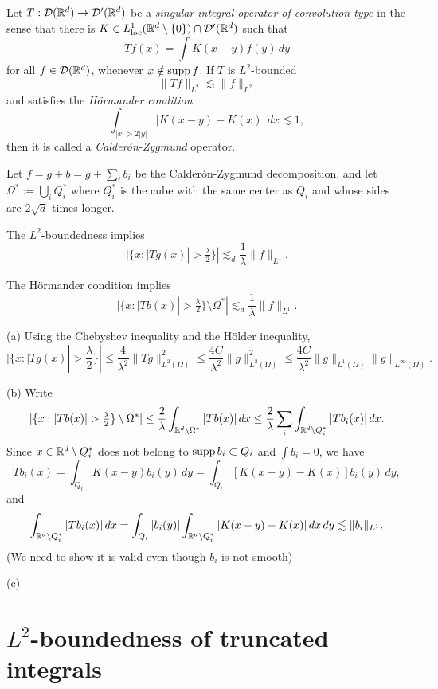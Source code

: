 \documentclass{../note}
\begin{document}
\begin{prb}
Let $T:\mathcal{D}(\mathbb{R}^d)\to\mathcal{D}'(\mathbb{R}^d)$ be a \emph{singular integral operator of convolution type} in the sense that there is $K\in L_{\mathrm{loc}}^1(\mathbb{R}^d\setminus\{0\})\cap\mathcal{D}'(\mathbb{R}^d)$ such that
\[Tf(x)=\int K(x-y)f(y)\,dy\]
for all $f\in\mathcal{D}(\mathbb{R}^d)$, whenever $x\notin\operatorname{supp} f$.
If $T$ is $L^2$-bounded
\[\|Tf\|_{L^2}\lesssim\|f\|_{L^2}\]
and satisfies the \emph{H\"ormander condition}
\[\int_{|x|>2|y|}|K(x-y)-K(x)|\,dx\lesssim1,\]
then it is called a \emph{Calder\'on-Zygmund} operator.

Let $f=g+b=g+\sum_ib_i$ be the Calder\'on-Zygmund decomposition, and let $\Omega^*:=\bigcup_iQ_i^*$ where $Q_i^*$ is the cube with the same center as $Q_i$ and whose sides are $2\sqrt d$ times longer. 
\begin{parts}
\item
The $L^2$-boundedness implies
\[|\{x:|Tg(x)|>\tfrac\lambda2\}|\lesssim_d\frac1\lambda\|f\|_{L^1}.\]
\item
The H\"ormander condition implies
\[|\{x:|Tb(x)|>\tfrac\lambda2\}\setminus\Omega^*|\lesssim_d\frac1\lambda\|f\|_{L^1}.\]
\item
\end{parts}
\end{prb}
\begin{pf}
(a)
Using the Chebyshev inequality and the H\"older inequality,
\[|\{x:|Tg(x)|>\frac\lambda2\}|
\le\frac4{\lambda^2}\|Tg\|_{L^2(\Omega)}^2
\le\frac{4C}{\lambda^2}\|g\|_{L^2(\Omega)}^2
\le\frac{4C}{\lambda^2}\|g\|_{L^1(\Omega)}\|g\|_{L^\infty(\Omega)}.
\]

(b)
Write
\[|\{x:|Tb(x)|>\tfrac\lambda2\}\setminus\Omega^*|
\le\frac2\lambda\int_{\R^d\setminus\Omega^*}|Tb(x)|\,dx
\le\frac2\lambda\sum_i\int_{\R^d\setminus Q_i^*}|Tb_i(x)|\,dx.\]
Since $x\in\mathbb{R}^d\setminus Q_i^*$ does not belong to $\operatorname{supp} b_i\subset Q_i$ and $\int b_i=0$, we have
\[Tb_i(x)=\int_{Q_i}K(x-y)b_i(y)\,dy=\int_{Q_i}[K(x-y)-K(x)]b_i(y)\,dy,\]
and
\[\int_{\mathbb{R}^d\setminus Q_i^*}|Tb_i(x)|\,dx
=\int_{Q_i}|b_i(y)|\int_{\mathbb{R}^d\setminus Q_i^*}|K(x-y)-K(x)|\,dx\,dy
\lesssim\|b_i\|_{L^1}.\]
(We need to show it is valid even though $b_i$ is not smooth)

(c)

\end{pf}

\section{$L^2$-boundedness of truncated integrals}
\end{document}
